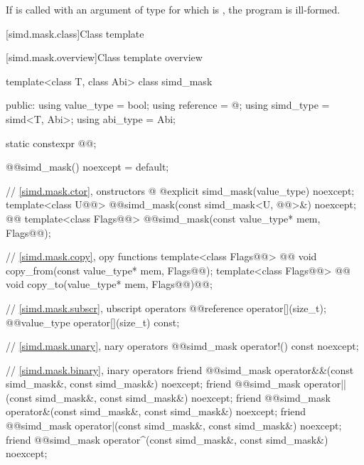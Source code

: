 \pnum
If  is called with an argument of type  for which  is , the program is ill-formed.

[simd.mask.class]{Class template }

[simd.mask.overview]{Class template  overview}

\begin{codeblock}
template<class T, class Abi> class simd_mask {
public:
  using value_type = bool;
  using reference = @\seebelow@;
  using simd_type = simd<T, Abi>;
  using abi_type = Abi;

  static constexpr @@;

  @@simd_mask() noexcept = default;

  // \ref{simd.mask.ctor}, onstructors
  @ @explicit simd_mask(value_type) noexcept;
  template<class U@@>
    @@simd_mask(const simd_mask<U, @@>&) noexcept;
  @@
  template<class Flags@@>
    @@simd_mask(const value_type* mem, Flags@\wgAdd{ = \{\}}@);

  // \ref{simd.mask.copy}, opy functions
  template<class Flags@@>
    @@ void copy_from(const value_type* mem, Flags@\wgAdd{ = \{\}}@);
  template<class Flags@@>
    @@ void copy_to(value_type* mem, Flags@\wgAdd{ = \{\}}@)@@;

  // \ref{simd.mask.subscr}, ubscript operators
  @@reference operator[](size_t);
  @@value_type operator[](size_t) const;

  // \ref{simd.mask.unary}, nary operators
  @@simd_mask operator!() const noexcept;

  // \ref{simd.mask.binary}, inary operators
  friend @@simd_mask operator&&(const simd_mask&, const simd_mask&) noexcept;
  friend @@simd_mask operator||(const simd_mask&, const simd_mask&) noexcept;
  friend @@simd_mask operator&(const simd_mask&, const simd_mask&) noexcept;
  friend @@simd_mask operator|(const simd_mask&, const simd_mask&) noexcept;
  friend @@simd_mask operator^(const simd_mask&, const simd_mask&) noexcept;

}
\end{codeblock}
